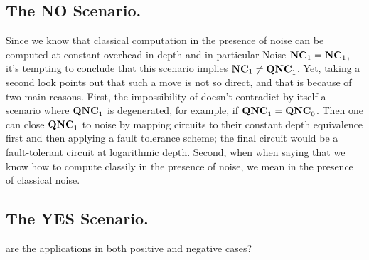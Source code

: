 \documentclass[manuscript,screen,review]{acmart}
\begin{document}
{  \subsection{The NO Scenario.} 
  Since we know that classical computation in the presence of noise can be computed at constant overhead in depth and in particular Noise-$\mathbf{NC}_{1} = \mathbf{NC}_{1}$, it's tempting to conclude that this scenario implies $\mathbf{NC}_{1} \neq \mathbf{QNC}_{1}$. Yet, taking a second look points out that such a move is not so direct, and that is because of two main reasons. First, the impossibility of \CDO{} doesn't contradict by itself a scenario where $\mathbf{QNC}_{1}$ is degenerated, for example, if $\mathbf{QNC}_{1} = \mathbf{QNC}_{0}$. Then one can close $\mathbf{QNC}_{1}$ to noise by mapping circuits to their constant depth equivalence first and then applying a fault tolerance scheme; the final circuit would be a fault-tolerant circuit at logarithmic depth. 
  Second, when when saying that we know how to compute classily in the presence of noise, we mean in the presence of classical noise.  

  \subsection{The YES Scenario.} 

  are the applications in both positive and negative cases?








}
\end{document}
